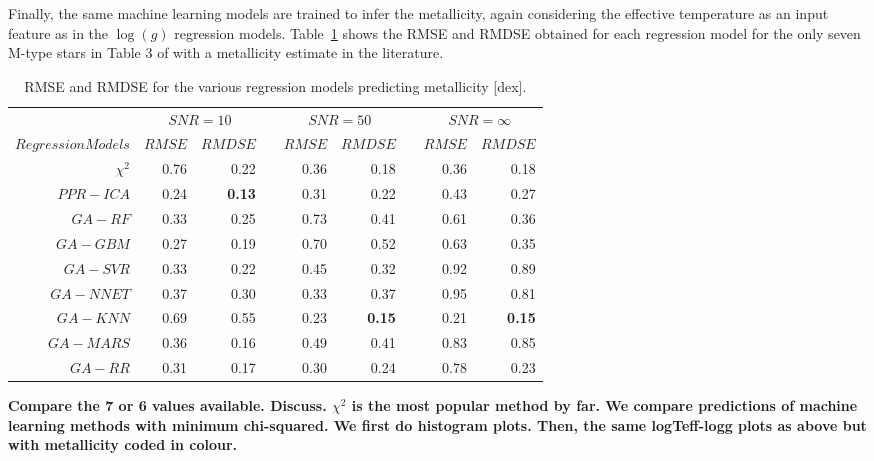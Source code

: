 Finally, the same machine learning models are trained to infer the
metallicity, again considering the effective temperature as an input
feature as in the $\log(g)$ regression
models. Table~\ref{tab:models_M_rmse} shows the RMSE and RMDSE
obtained for each regression model for the only seven M-type stars in
Table 3 of \cite{cesetti} with a metallicity estimate in the
literature.
%
%
\begin{table}\centering
\begin{tabular}{@{}rrrcrrcrr@{}}\toprule
& \multicolumn{2}{c}{$SNR = 10$} & \phantom{ab}& \multicolumn{2}{c}{$SNR = 50$} &
\phantom{ab} & \multicolumn{2}{c}{$SNR = \infty$}\\
\cmidrule{2-3} \cmidrule{5-6} \cmidrule{8-9}
$Regression Models$ & $RMSE$ & $RMDSE$ && $RMSE$ & $RMDSE$     && $RMSE$       & $RMDSE$ \\ \midrule
$\chi^2$    & 0.76 & 0.22      && 0.36 & 0.18     && 0.36 & 0.18 \\
$PPR-ICA$   & 0.24 & \bf{0.13} && 0.31 & 0.22     && 0.43 & 0.27 \\
$GA-RF$     & 0.33 & 0.25      && 0.73 & 0.41     && 0.61 & 0.36 \\
$GA-GBM$    & 0.27 & 0.19      && 0.70 & 0.52     && 0.63 & 0.35 \\
$GA-SVR$    & 0.33 & 0.22      && 0.45 & 0.32     && 0.92 & 0.89 \\
$GA-NNET$   & 0.37 & 0.30      && 0.33 & 0.37     && 0.95 & 0.81 \\
$GA-KNN$    & 0.69 & 0.55      && 0.23 & \bf{0.15}&& 0.21 & \bf{0.15} \\ 
$GA-MARS$   & 0.36 & 0.16      && 0.49 & 0.41     && 0.83 & 0.85 \\
$GA-RR$     & 0.31 & 0.17      && 0.30 & 0.24     && 0.78 & 0.23 \\

\bottomrule
\end{tabular}
\caption {RMSE and RMDSE for the various regression models predicting
  metallicity [dex].}
\label{tab:models_M_rmse} 
\end{table}



{\bf Compare the 7 or 6 values available. Discuss.  $\chi^2$ is
  the most popular method by far. We compare predictions of machine
  learning methods with minimum chi-squared. We first do histogram
  plots. Then, the same logTeff-logg plots as above but with
  metallicity coded in colour.}

